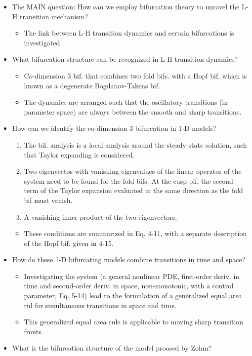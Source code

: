 \documentclass[a4paper]{article}
\begin{document}
\begin{itemize}
\item
  The MAIN question: How can we employ bifurcation theory to unravel the
  L-H transition mechanism?

  \begin{itemize}
  \itemsep1pt\parskip0pt
  \item
    The link between L-H transition dynamics and certain bifurcations is
    investigated.
  \end{itemize}
\item
  What bifurcation structure can be recognized in L-H transition
  dynamics?

  \begin{itemize}
  \item
    Co-dimension 3 bif. that combines two fold bifs. with a Hopf bif,
    which is known as a degenerate Bogdanov-Takens bif.
  \item
    The dynamics are arranged such that the oscillatory transitions (in
    parameter space) are always between the smooth and sharp
    transitions.
  \end{itemize}
\item
  How can we identify the co-dimension 3 bifurcation in 1-D models?

  \begin{enumerate}
  \def\labelenumi{\arabic{enumi}.}
  \item
    The bif. analysis is a local analysis around the steady-state
    solution, such that Taylor expanding is considered.
  \item
    Two eigenvectos with vanishing eigenvalues of the linear operator of
    the system need to be found for the fold bifs. At the cusp bif, the
    second term of the Taylor expansion evaluated in the same direction
    as the fold bif must vanish.
  \item
    A vanishing inner product of the two eigenvectors.
  \end{enumerate}

  \begin{itemize}
  \itemsep1pt\parskip0pt
  \item
    These conditions are summarized in Eq. 4-11, with a separate
    description of the Hopf bif. given in 4-15.
  \end{itemize}
\item
  How do these 1-D bifurcating models combine transitions in time and
  space?

  \begin{itemize}
  \item
    Investigating the system (a general nonlinear PDE, first-order
    deriv. in time and second-order deriv. in space, non-monotonic, with
    a control parameter, Eq. 5-14) lead to the formulation of a
    generalized equal area rul for simultaneous transitions in space and
    time.
  \item
    This generalized equal area rule is applicable to moving sharp
    transition fronts.
  \end{itemize}
\item
  What is the bifurcation structure of the model proosed by Zohm?


\end{itemize}
\end{document}
